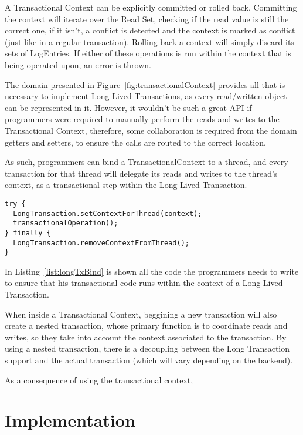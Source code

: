 A Transactional Context can be explicitly committed or rolled
back. Committing the context will iterate over the Read Set, checking
if the read value is still the correct one, if it isn't, a conflict is
detected and the context is marked as conflict (just like in a regular
transaction). Rolling back a context will simply discard its sets of
LogEntries. If either of these operations is run within the context
that is being operated upon, an error is thrown.

The domain presented in Figure~\ref{fig:transactionalContext} provides
all that is necessary to implement Long Lived Transactions, as every
read/written object can be represented in it. However, it wouldn't be
such a great API if programmers were required to manually perform the
reads and writes to the Transactional Context, therefore, some
collaboration is required from the domain getters and setters, to
ensure the calls are routed to the correct location.

As such, programmers can bind a TransactionalContext to a thread, and
every transaction for that thread will delegate its reads and writes
to the thread's context, as a transactional step within the Long Lived
Transaction. 

\begin{lstlisting}[caption={Example of TransactionalContext usage},
  label={list:longTxBind}]
try {
  LongTransaction.setContextForThread(context);
  transactionalOperation();
} finally {
  LongTransaction.removeContextFromThread();
}
\end{lstlisting}

In Listing~\ref{list:longTxBind} is shown all the code the programmers
needs to write to ensure that his transactional code runs within the
context of a Long Lived Transaction.

When inside a Transactional Context, beggining a new transaction will
also create a nested transaction, whose primary function is to
coordinate reads and writes, so they take into account the context
associated to the transaction. By using a nested transaction, there is
a decoupling between the Long Transaction support and the actual
transaction (which will vary depending on the backend).

As a consequence of using the transactional context, 

\section{Implementation}

